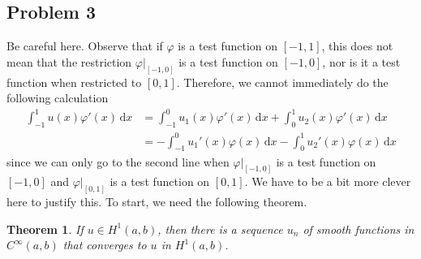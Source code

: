 \documentclass{article}
\theoremstyle{definition}
\theoremstyle{plain}
\newtheorem{theorem}{Theorem}
\renewcommand{\d}{\mathrm d}
\begin{document}
\subsection{Problem 3}
Be careful here.
Observe that if $\varphi$ is a test function on $[-1,1]$, this does not mean that the restriction $\varphi|_{[-1,0]}$ is a test function on $[-1,0]$, nor is it a test function when restricted to $[0,1]$.
Therefore, we cannot immediately do the following calculation
\begin{align*}
  \int_{-1}^1u(x)\varphi'(x)\,\d x &= \int_{-1}^0u_1(x)\varphi'(x)\,\d x + \int_0^1u_2(x)\varphi'(x)\,\d x \\
                                   & = -\int_{-1}^0u_1'(x)\varphi(x)\,\d x - \int_0^1u_2'(x)\varphi(x)\,\d x
\end{align*}
since we can only go to the second line when $\varphi|_{[-1,0]}$ is a test function on $[-1,0]$ and $\varphi|_{[0,1]}$ is a test function on $[0,1]$.
We have to be a bit more clever here to justify this.
To start, we need the following theorem.

\begin{theorem}
  If $u \in H^1(a,b)$, then there is a sequence $u_n$ of smooth functions in $C^{\infty}(a,b)$ that converges to $u$ in $H^1(a,b)$.
\end{theorem}
\end{document}
